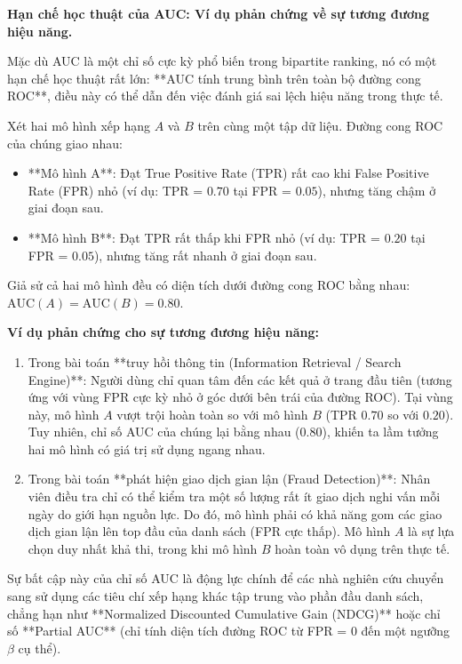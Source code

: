 \begin{extension}
\textbf{Hạn chế học thuật của AUC: Ví dụ phản chứng về sự tương đương hiệu năng.}

Mặc dù AUC là một chỉ số cực kỳ phổ biến trong bipartite ranking, nó có một hạn chế học thuật rất lớn: **AUC tính trung bình trên toàn bộ đường cong ROC**, điều này có thể dẫn đến việc đánh giá sai lệch hiệu năng trong thực tế.

Xét hai mô hình xếp hạng $A$ và $B$ trên cùng một tập dữ liệu. Đường cong ROC của chúng giao nhau:
\begin{itemize}
    \item **Mô hình A**: Đạt True Positive Rate (TPR) rất cao khi False Positive Rate (FPR) nhỏ (ví dụ: TPR = $0.70$ tại FPR = $0.05$), nhưng tăng chậm ở giai đoạn sau.
    \item **Mô hình B**: Đạt TPR rất thấp khi FPR nhỏ (ví dụ: TPR = $0.20$ tại FPR = $0.05$), nhưng tăng rất nhanh ở giai đoạn sau.
\end{itemize}
Giả sử cả hai mô hình đều có diện tích dưới đường cong ROC bằng nhau: $\text{AUC}(A) = \text{AUC}(B) = 0.80$. 

\textbf{Ví dụ phản chứng cho sự tương đương hiệu năng:}
\begin{enumerate}
    \item Trong bài toán **truy hồi thông tin (Information Retrieval / Search Engine)**: Người dùng chỉ quan tâm đến các kết quả ở trang đầu tiên (tương ứng với vùng FPR cực kỳ nhỏ ở góc dưới bên trái của đường ROC). Tại vùng này, mô hình $A$ vượt trội hoàn toàn so với mô hình $B$ (TPR $0.70$ so với $0.20$). Tuy nhiên, chỉ số AUC của chúng lại bằng nhau ($0.80$), khiến ta lầm tưởng hai mô hình có giá trị sử dụng ngang nhau.
    \item Trong bài toán **phát hiện giao dịch gian lận (Fraud Detection)**: Nhân viên điều tra chỉ có thể kiểm tra một số lượng rất ít giao dịch nghi vấn mỗi ngày do giới hạn nguồn lực. Do đó, mô hình phải có khả năng gom các giao dịch gian lận lên top đầu của danh sách (FPR cực thấp). Mô hình $A$ là sự lựa chọn duy nhất khả thi, trong khi mô hình $B$ hoàn toàn vô dụng trên thực tế.
\end{enumerate}

Sự bất cập này của chỉ số AUC là động lực chính để các nhà nghiên cứu chuyển sang sử dụng các tiêu chí xếp hạng khác tập trung vào phần đầu danh sách, chẳng hạn như **Normalized Discounted Cumulative Gain (NDCG)** hoặc chỉ số **Partial AUC** (chỉ tính diện tích đường ROC từ FPR = $0$ đến một ngưỡng $\beta$ cụ thể).
\end{extension}

